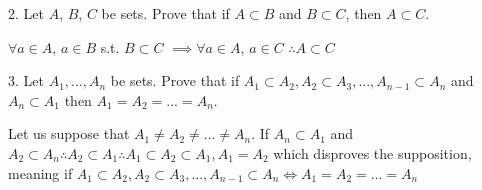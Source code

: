 2. Let $A$, $B$, $C$ be sets. Prove that if $A \subset B$ and $B \subset C$, then $A \subset C$. 

$\forall a \in A$, $a \in B$ s.t. $B \subset C$ $\implies \forall a \in A$, $a \in  C$ $\therefore A \subset C$

3. Let $A_{1}, ..., A_{n}$ be sets. Prove that if $A_{1} \subset A_{2}, A_{2} \subset A_{3}, ...,A_{n-1} \subset A_{n}$ and $A_{n} \subset A_{1}$ then $A_{1} = A_{2} = ... = A_{n}$.

Let us suppose that $A_{1} \not = A_{2} \not =...\not=A_{n}$.
If $A_{n} \subset A_{1}$ and $A_{2} \subset A_{n} \therefore A_{2} \subset A_{1} \therefore A_{1} \subset A_{2} \subset A_{1}, A_{1} = A_{2}$ which disproves the supposition, meaning if $A_{1} \subset A_{2}, A_{2} \subset A_{3}, ...,A_{n-1} \subset A_{n} \iff A_{1} = A_{2} = ... = A_{n}$




